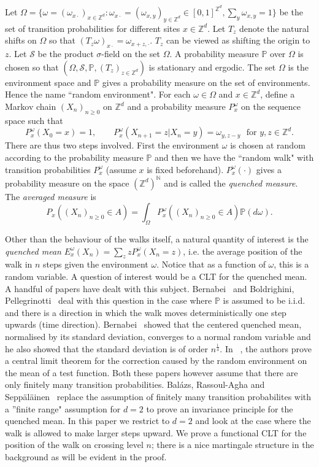 \documentclass[11pt]{amsart}
\begin{document}
Let $\Omega = \{\omega=(\omega_{x \cdot})_{x \in \mathbb{Z}^d}:\omega_{x \cdot}=(\omega_{x,y})_{y \in \mathbb{Z}^d} \in [0,1]^{\mathbb{Z}^d}, \sum_y \omega_{x,y}=1 \}$ be the set of transition probabilities for different sites $x \in \mathbb{Z}^d$. Let $T_z$ denote the natural shifts on $\Omega$ so that $(T_z\omega)_{x\cdot}=\omega_{x+z,\cdot}$. $T_z$ can be viewed as shifting the origin to $z$. Let $\mathcal{S}$ be the product $\sigma$-field on the set $\Omega$. A probability measure $\mathbb{P}$ over $\Omega$ is chosen so that $(\Omega,\mathcal{S},\mathbb{P},(T_z)_{z \in \mathbb{Z}^d})$ is stationary and ergodic. The set $\Omega$ is the environment space and $\mathbb{P}$ gives a probability measure on the set of environments. Hence the name ``random environment". For each $\omega \in \Omega$ and $x \in \mathbb{Z}^d$, define a Markov chain $(X_n)_{n \ge 0}$ on $\mathbb{Z}^d$ and a probability measure $P_x^{\omega}$ on the sequence space such that
  \[P_x^{\omega}(X_0 = x)=1, \qquad P_x^{\omega}(X_{n+1}=z\vert X_n=y)= \omega_{y,z-y} \,\, \mbox{ for } y,z \in \mathbb{Z}^d. \]
 There are thus two steps involved. First the environment $\omega$ is chosen at random according to the probability measure $\mathbb{P}$ and then we have the ``random walk" with transition probabilities $P_x^{\omega}$ (assume $x$ is fixed beforehand). $P_x^{\omega}(\cdot)$  gives a probability measure on the space $(\mathbb{Z}^d)^{\mathbb{N}}$ and is called the \textit{quenched measure}. The \textit{averaged measure} is 
 \[ P_{x}( (X_n)_{n \ge 0} \in A) =\int_{\Omega} P_x^{\omega}((X_n)_{n \ge 0} \in A)\mathbb{P}(d\omega).\]

Other than the behaviour of the walks itself, a natural quantity of interest is the \textit{quenched mean} $E_x^{\omega}(X_n)= \sum_z z P_x^{\omega}(X_n=z)$, i.e. the average position of the walk in $n$ steps given the environment $\omega$. Notice that as a function of $\omega$, this is a random variable. A question of interest would be a CLT for the quenched mean. A handful of papers have dealt with this subject. Bernabei~\cite{ber} and Boldrighini, Pellegrinotti~\cite{bp} deal with this question in the case where $\mathbb{P}$ is assumed to be i.i.d. and there is a direction in which the walk moves deterministically one step upwards (time direction). Bernabei~\cite{ber} showed that the centered quenched mean, normalised by its standard deviation, converges to a normal random variable and he also showed that the standard deviation is of order $n^{\frac{1}{4}}$. In ~\cite{bp}, the authors prove a central limit theorem for the correction caused by the random environment on the mean of a test function. Both these papers however assume that there are only finitely many transition probabilities. Bal\'azs, Rassoul-Agha and Sepp\"al\"ainen~\cite{brs} replace the assumption of finitely many transition probabilites with a ''finite range" assumption for $d=2$ to prove an invariance principle for the quenched mean. In this paper we restrict to $d=2$ and look at the case where the walk is allowed to make larger steps upward. We prove a functional CLT for the position of the walk on crossing level $n$; there is a nice martingale structure in the background as will be evident in the proof.
\end{document}
